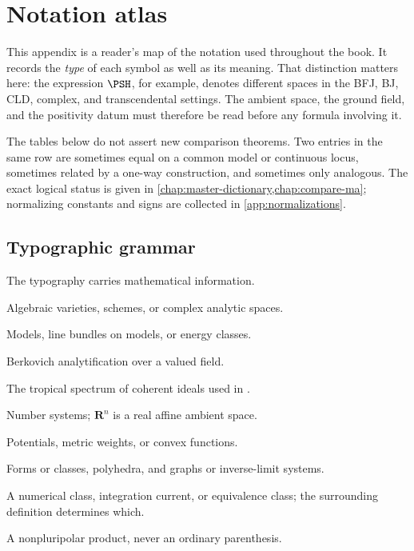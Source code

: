 \chapter{Notation atlas}
\label{app:notation}

This appendix is a reader's map of the notation used throughout the book.
It records the \emph{type} of each symbol as well as its meaning.  That
distinction matters here: the expression \(\PSH\), for example, denotes
different spaces in the BFJ, BJ, CLD, complex, and transcendental settings.
The ambient space, the ground field, and the positivity datum must therefore
be read before any formula involving it.

The tables below do not assert new comparison theorems.  Two entries in the
same row are sometimes equal on a common model or continuous locus, sometimes
related by a one-way construction, and sometimes only analogous.  The exact
logical status is given in \cref{chap:master-dictionary,chap:compare-ma};
normalizing constants and signs are collected in
\cref{app:normalizations}.

\section{Typographic grammar}
\label{sec:appK-typography}


The typography carries mathematical information.

\begin{description}[style=nextline,leftmargin=1.5em,labelindent=0pt]
\item[Roman capitals: \(X,Y,Z,S\).]
Algebraic varieties, schemes, or complex analytic spaces.
\item[Calligraphic capitals: \(\cX,\cY,\cL,\cE\).]
Models, line bundles on models, or energy classes.
\item[Superscript \(\An\): \(X^{\An},f^{\An}\).]
Berkovich analytification over a valued field.
\item[Superscript \(\bethan\): \(X^{\bethan}\).]
The tropical spectrum of coherent ideals used in
.
\item[Bold capitals: \(\mathbf R,\mathbf Q,\mathbf Z\).]
Number systems; \(\mathbf R^n\) is a real affine ambient space.
\item[Greek lower case: \(\phi,\psi,\varphi,u\).]
Potentials, metric weights, or convex functions.
\item[Greek upper case: \(\Theta,\Delta,\Gamma\).]
Forms or classes, polyhedra, and graphs or inverse-limit systems.
\item[{Square brackets: \([D],[Z],[\phi]\).}]
A numerical class, integration current, or equivalence class; the surrounding
definition determines which.
\item[Angle brackets: \(\langle\theta_\phi^n\rangle\).]
A nonpluripolar product, never an ordinary parenthesis.
\end{description}

